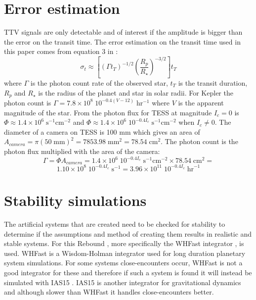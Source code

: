 \documentclass[12pt]{report}
\begin{document}
\section{Error estimation}
	TTV signals are only detectable and of interest if the amplitude is bigger than the error on the transit time. The error estimation on the transit time used in this paper comes from equation 3 in \cite{2005Sci...307.1288H}:
	\begin{equation}
		\sigma_t \approx \left[\left(\Gamma t_T\right)^{-1/2}  \left(\frac{R_p}{R_{\star}}\right)^{-3/2}\right] t_T
	\end{equation}
	where $\Gamma$ is the photon count rate of the observed star, $t_T$ is the transit duration, $R_p$ and $R_{\star}$ is the radius of the planet and star in solar radii. For Kepler the photon count is $\Gamma = 7.8 \times 10^8\; 10^{-0.4(V-12)} \; \mathrm{hr^{-1}}$ where $V$ is the apparent magnitude of the star. From \cite{2015ApJ...809...77S} the photon flux for TESS at magnitude $I_c=0$ is $\Phi \approx 1.4 \times 10^6 \; \mathrm{s^{-1} cm^{-2}}$ and $\Phi \approx 1.4 \times 10^6 \; 10^{-0.4I_c} \; \mathrm{s^{-1} cm^{-2}}$ when $I_c \neq 0$. The diameter of a camera on TESS is 100 mm which gives an area of $A_{camera} = \pi (50 \; \mathrm{mm})^2 = 7853.98 \; \mathrm{mm}^2 = 78.54 \; \mathrm{cm}^2$. The photon count is the photon flux multiplied with the area of the camera:
	\begin{equation}
		\Gamma = \Phi A_{camera} = 1.4 \times 10^6\; 10^{-0.4I_c} \; \mathrm{s^{-1} cm^{-2}} \times 78.54 \; \mathrm{cm}^2 = 
	\end{equation}
	\begin{equation}
	1.10 \times 10^{8}\; 10^{-0.4I_c} \; \mathrm{s}^{-1} = 3.96 \times 10^{11} \; 10^{-0.4I_c} \; \mathrm{hr}^{-1}
	\end{equation}
	
\section{Stability simulations}
	The artificial systems that are created need to be checked for stability to determine if the assumptions and method of creating them results in realistic and stable systems. For this Rebound \citep{2012A&A...537A.128R}, more specifically the WHFast integrator \citep{2015MNRAS.452..376R}, is used. WHFast is a Wisdom-Holman integrator used for long duration planetary system simulations. For some systems close-encounters occur, WHFast is not a good integrator for these and therefore if such a system is found it will instead be simulated with IAS15 \citep{2015MNRAS.446.1424R}. IAS15 is another integrator for gravitational dynamics and although slower than WHFast it handles close-encounters better.
	
\end{document}
